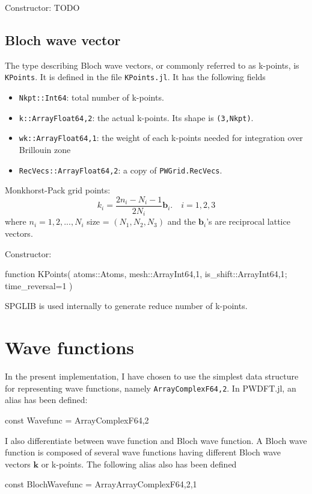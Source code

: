 \documentclass[a4paper,10pt,twocolumn]{paper}
\newcommand{\jlcode}[1]{\texttt{#1}}
\begin{document}
Constructor: TODO

\subsection{Bloch wave vector}

The type describing Bloch wave vectors, or commonly referred
to as k-points, is \jlcode{KPoints}. It is defined in the file
\jlcode{KPoints.jl}. It has the following fields
%
\begin{itemize}
%
\item \jlcode{Nkpt::Int64}: total number of k-points.
%
\item \jlcode{k::Array{Float64,2}}: the actual k-points.
  Its shape is \jlcode{(3,Nkpt)}.
%
\item \jlcode{wk::Array{Float64,1}}: the weight of each k-points needed
  for integration over Brillouin zone
%
\item \jlcode{RecVecs::Array{Float64,2}}: a copy of \jlcode{PWGrid.RecVecs}.
\end{itemize}

Monkhorst-Pack grid points:
%
\begin{equation}
k_{i} = \frac{2n_i -N_i - 1}{2N_i} \mathbf{b}_i.\hspace{1em}
i = 1,2,3
\end{equation}
%
where $n_i=1,2,...,N_{i}$
size = \((N_1, N_2, N_3)\) and the \(\mathbf{b}_i\)'s are reciprocal lattice vectors.


Constructor:

\begin{juliacode}
function KPoints( atoms::Atoms, mesh::Array{Int64,1}, is_shift::Array{Int64,1};
                  time_reversal=1 )
\end{juliacode}

SPGLIB is used internally to generate reduce number of k-points.


\section{Wave functions}

In the present implementation, I have chosen to use the simplest
data structure for representing wave functions, namely
\jlcode{Array{ComplexF64,2}}. In \textsf{PWDFT.jl}, an alias
has been defined:
\begin{juliacode}
const Wavefunc = Array{ComplexF64,2}
\end{juliacode}

I also differentiate between wave function and Bloch wave function.
A Bloch wave function is composed of several wave functions having
different Bloch wave vectors $\mathbf{k}$ or k-points.
The following alias also has been defined
\begin{juliacode}
const BlochWavefunc = Array{Array{ComplexF64,2},1}
\end{juliacode}
\end{document}
